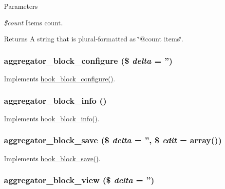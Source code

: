 \begin{DoxyParams}{Parameters}
\item[{\em \$count}]Items count.\end{DoxyParams}
\begin{DoxyReturn}{Returns}
A string that is plural-\/formatted as \char`\"{}@count items\char`\"{}. 
\end{DoxyReturn}
\hypertarget{aggregator_8module_a94a7b69367b6844d1e724fdc11b6093a}{
\subsubsection[{aggregator\_\-block\_\-configure}]{\setlength{\rightskip}{0pt plus 5cm}aggregator\_\-block\_\-configure (\$ {\em delta} = {\ttfamily ''})}}
\label{aggregator_8module_a94a7b69367b6844d1e724fdc11b6093a}
Implements \hyperlink{group__hooks_gacc86fefd1e0299f387f79a37dd1a48b7}{hook\_\-block\_\-configure()}. \hypertarget{aggregator_8module_a5655c78445ab9448ec41bce3148a88ec}{
\subsubsection[{aggregator\_\-block\_\-info}]{\setlength{\rightskip}{0pt plus 5cm}aggregator\_\-block\_\-info ()}}
\label{aggregator_8module_a5655c78445ab9448ec41bce3148a88ec}
Implements \hyperlink{group__hooks_ga2bd926c3e90deeba0c3ba64fb3c64d73}{hook\_\-block\_\-info()}. \hypertarget{aggregator_8module_a52bde45afbc3605fa4607d51978ab488}{
\subsubsection[{aggregator\_\-block\_\-save}]{\setlength{\rightskip}{0pt plus 5cm}aggregator\_\-block\_\-save (\$ {\em delta} = {\ttfamily ''}, \/  \$ {\em edit} = {\ttfamily array()})}}
\label{aggregator_8module_a52bde45afbc3605fa4607d51978ab488}
Implements \hyperlink{group__hooks_ga622024ce4f818c241ca7a765e829f928}{hook\_\-block\_\-save()}. \hypertarget{aggregator_8module_aad90d37427f960f03e64ff1ac7baade9}{
\subsubsection[{aggregator\_\-block\_\-view}]{\setlength{\rightskip}{0pt plus 5cm}aggregator\_\-block\_\-view (\$ {\em delta} = {\ttfamily ''})}}
